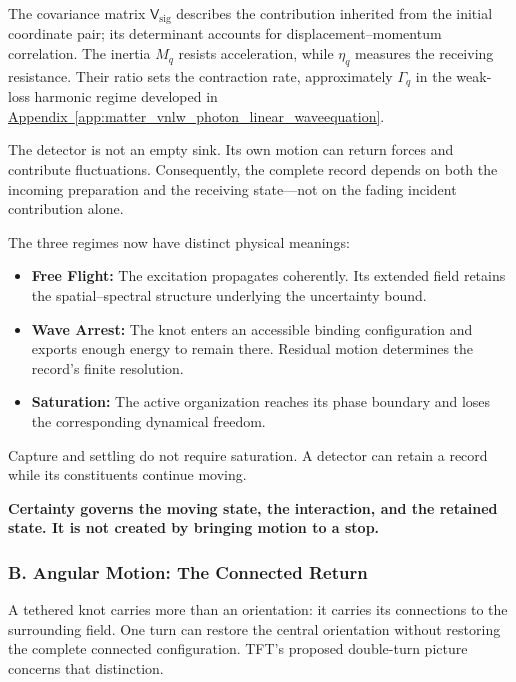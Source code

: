 The covariance matrix $\mathsf V_{\mathrm{sig}}$ describes the contribution inherited from the initial coordinate pair; its determinant accounts for displacement--momentum correlation. The inertia $M_q$ resists acceleration, while $\eta_q$ measures the receiving resistance. Their ratio sets the contraction rate, approximately $\Gamma_q$ in the weak-loss harmonic regime developed in \hyperref[app:matter_vnlw_photon_linear_waveequation]{Appendix~\ref*{app:matter_vnlw_photon_linear_waveequation}}.

The detector is not an empty sink. Its own motion can return forces and contribute fluctuations. Consequently, the complete record depends on both the incoming preparation and the receiving state---not on the fading incident contribution alone.

The three regimes now have distinct physical meanings:
\begin{itemize}
    \item \textbf{Free Flight:}
    The excitation propagates coherently. Its extended field retains the spatial--spectral structure underlying the uncertainty bound.

    \item \textbf{Wave Arrest:}
    The knot enters an accessible binding configuration and exports enough energy to remain there. Residual motion determines the record's finite resolution.

    \item \textbf{Saturation:}
    The active organization reaches its phase boundary and loses the corresponding dynamical freedom.
\end{itemize}

Capture and settling do not require saturation. A detector can retain a record while its constituents continue moving.

\textbf{Certainty governs the moving state, the interaction, and the retained state. It is not created by bringing motion to a stop.}

\subsubsection*{B. Angular Motion: The Connected Return}

A tethered knot carries more than an orientation: it carries its connections to the surrounding field. One turn can restore the central orientation without restoring the complete connected configuration. TFT's proposed double-turn picture concerns that distinction.

